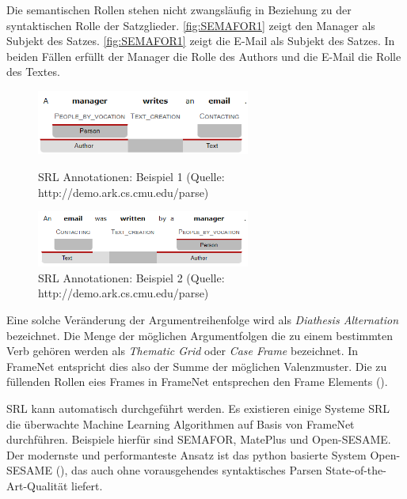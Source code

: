 Die semantischen Rollen stehen nicht zwangsläufig in Beziehung zu der syntaktischen Rolle der Satzglieder. \ref{fig:SEMAFOR1} zeigt den Manager als Subjekt des Satzes. \ref{fig:SEMAFOR1} zeigt die E-Mail als Subjekt des Satzes. In beiden Fällen erfüllt der Manager die Rolle des Authors und die E-Mail die Rolle des Textes.
\par
\begin{figure}
\includegraphics[width=7cm]{pictures/SEMAFOR1.png}
\caption{\ac{SRL} Annotationen: Beispiel 1 (Quelle: http://demo.ark.cs.cmu.edu/parse)}
\label{fig:SEMAFOR1}
\includegraphics[width=7cm]{pictures/SEMAFOR2.png}
\caption{\ac{SRL} Annotationen: Beispiel 2 (Quelle: http://demo.ark.cs.cmu.edu/parse)}
\label{fig:SEMAFOR2}
\end{figure}
\par
Eine solche Veränderung der Argumentreihenfolge wird als \textit{Diathesis Alternation} bezeichnet. Die Menge der möglichen Argumentfolgen die zu einem bestimmten Verb gehören werden als \textit{Thematic Grid} oder \textit{Case Frame} bezeichnet. In FrameNet entspricht dies also der Summe der möglichen Valenzmuster. Die zu füllenden Rollen eies Frames in FrameNet entsprechen den Frame Elements (\cite[vgl.][383]{JURAFSKY}).
\par
\ac{SRL} kann automatisch durchgeführt werden. Es existieren einige Systeme \ac{SRL} die überwachte Machine Learning Algorithmen auf Basis von FrameNet durchführen. Beispiele hierfür sind SEMAFOR, MatePlus und Open-SESAME. Der modernste und performanteste Ansatz ist das python basierte System Open-SESAME (\cite[vgl.][8]{SWAYAMDIPTA}), das auch ohne vorausgehendes syntaktisches Parsen State-of-the-Art-Qualität liefert.
